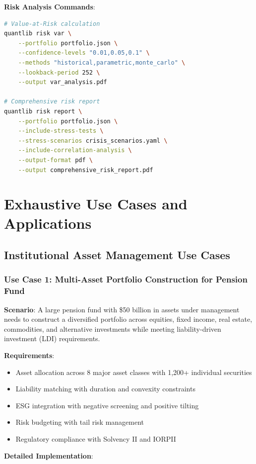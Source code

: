 \documentclass[12pt,a4paper]{article}
\theoremstyle{definition}
\theoremstyle{remark}
\begin{document}
\textbf{Risk Analysis Commands}:
\begin{lstlisting}[language=bash,caption=CLI Risk Commands]
# Value-at-Risk calculation
quantlib risk var \
    --portfolio portfolio.json \
    --confidence-levels "0.01,0.05,0.1" \
    --methods "historical,parametric,monte_carlo" \
    --lookback-period 252 \
    --output var_analysis.pdf

# Comprehensive risk report
quantlib risk report \
    --portfolio portfolio.json \
    --include-stress-tests \
    --stress-scenarios crisis_scenarios.yaml \
    --include-correlation-analysis \
    --output-format pdf \
    --output comprehensive_risk_report.pdf
\end{lstlisting}

\section{Exhaustive Use Cases and Applications}

\subsection{Institutional Asset Management Use Cases}

\subsubsection{Use Case 1: Multi-Asset Portfolio Construction for Pension Fund}

\textbf{Scenario}: A large pension fund with \$50 billion in assets under management needs to construct a diversified portfolio across equities, fixed income, real estate, commodities, and alternative investments while meeting liability-driven investment (LDI) requirements.

\textbf{Requirements}:
\begin{itemize}
    \item Asset allocation across 8 major asset classes with 1,200+ individual securities
    \item Liability matching with duration and convexity constraints
    \item ESG integration with negative screening and positive tilting
    \item Risk budgeting with tail risk management
    \item Regulatory compliance with Solvency II and IORPII
\end{itemize}

\textbf{Detailed Implementation}:
\end{document}
